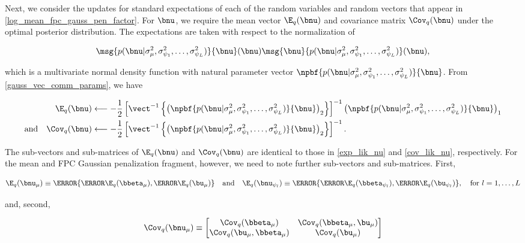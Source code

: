 \documentclass[12pt]{article}
\def\sigsqmu{\sigma^2_{\mu}}
\def\betamu{\bbeta_\mu}
\def\umu{\bu_\mu}
\def\numu{\bnu_\mu}
\newcommand\betapsi[1]{\bbeta_{\psi_{#1}}}
\newcommand\upsi[1]{\bu_{\psi_{#1}}}
\newcommand\nupsi[1]{\bnu_{\psi_{#1}}}
\newcommand\sigsqpsi[1]{\sigma^2_{\psi_{#1}}}
\theoremstyle{plain}
\theoremstyle{definition}
\theoremstyle{remark}
\begin{document}
Next, we consider the updates for standard expectations of each of the random variables and random vectors
that appear in \eqref{log_mean_fpc_gauss_pen_factor}. For $\bnu$, we require the mean vector $\E_q (\bnu)$
and covariance matrix $\Cov_q (\bnu)$ under the optimal posterior distribution. The expectations are taken with
respect to the normalization of

\[
	\msg{p(\bnu | \sigsqmu, \sigsqpsi{1}, \dots, \sigsqpsi{L})}{\bnu} (\bnu)
	\msg{\bnu}{p(\bnu | \sigsqmu, \sigsqpsi{1}, \dots, \sigsqpsi{L})} (\bnu),
\]

\noindent which is a multivariate normal density function with natural parameter vector $\npbf{p(\bnu | \sigsqmu,
\sigsqpsi{1}, \dots, \sigsqpsi{L})}{\bnu}$. From \eqref{gauss_vec_comm_params}, we have

\begin{align}
\begin{split}
	\E_q (\bnu)
		&\longleftarrow
			-\frac12 \left[
				\vect^{-1} \left\{
					\left( \npbf{p(\bnu | \sigsqmu, \sigsqpsi{1}, \dots, \sigsqpsi{L})}{\bnu} \right)_2
				\right\}
			\right]^{-1} \left( \npbf{p(\bnu | \sigsqmu, \sigsqpsi{1}, \dots, \sigsqpsi{L})}{\bnu} \right)_1 \\
	\text{and} \quad
	\Cov_q (\bnu)
		&\longleftarrow
			-\frac12 \left[
				\vect^{-1} \left\{
					\left( \npbf{p(\bnu | \sigsqmu, \sigsqpsi{1}, \dots, \sigsqpsi{L})}{\bnu} \right)_2
				\right\}
			\right]^{-1}.
\end{split}
\label{mom_pen_nu}
\end{align}

\noindent The sub-vectors and sub-matrices of $\E_q (\bnu)$ and $\Cov_q (\bnu)$ are identical to those in
\eqref{exp_lik_nu} and \eqref{cov_lik_nu}, respectively. For the mean and FPC Gaussian penalization fragment,
however, we need to note further sub-vectors and sub-matrices. First,

\begin{equation}
	\E_q (\numu) \equiv \T{\left\{ \T{\E_q (\betamu)}, \T{\E_q (\umu)} \right\}} \quad
	\text{and} \quad
	\E_q (\nupsi{l}) \equiv \T{\left\{ \T{\E_q (\betapsi{l})}, \T{\E_q (\upsi{l})} \right\}}, \quad
	\text{for $l = 1, \dots, L$}
\label{exp_betau}
\end{equation}

\noindent and, second,

\begin{equation}
	\Cov_q (\numu) \equiv \begin{bmatrix}
		\Cov_q (\betamu) & \Cov_q (\betamu, \umu) \\
		\Cov_q (\umu, \betamu) & \Cov_q (\umu)
	\end{bmatrix}
\label{cov_betau_mu}
\end{equation}
\end{document}
